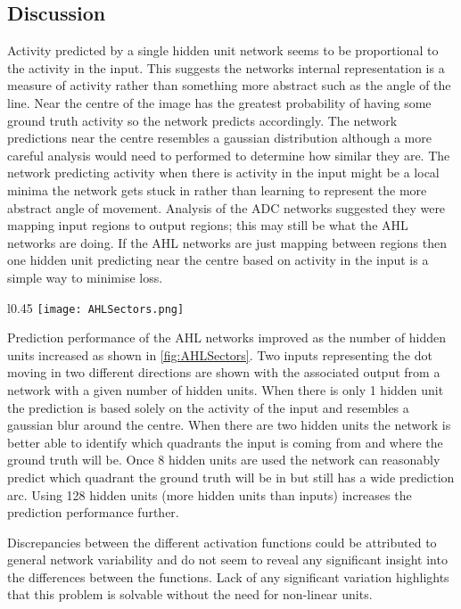 \subsection{Discussion}
Activity predicted by a single hidden unit network seems to be proportional to the activity in the input.
This suggests the networks internal representation is a measure of activity rather than something more abstract such as the angle of the line.
Near the centre of the image has the greatest probability of having some ground truth activity so the network predicts accordingly.
The network predictions near the centre resembles a gaussian distribution although a more careful analysis would need to performed to determine how similar they are. 
The network predicting activity when there is activity in the input might be a local minima the network gets stuck in rather than learning to represent the more abstract angle of movement. 
Analysis of the ADC networks suggested they were mapping input regions to output regions; this may still be what the AHL networks are doing. 
If the AHL networks are just mapping between regions then one hidden unit predicting near the centre based on activity in the input is a simple way to minimise loss. 

\begin{wrapfigure}[27]{l}{0.45\textwidth}
    \centering
    \texttt{[image: AHLSectors.png]}
    \caption{Two AHL inputs/prediction pairs for different numbers of hidden units.}
    \label{fig:AHLSectors}
\end{wrapfigure}

Prediction performance of the AHL networks improved as the number of hidden units increased as shown in \ref{fig:AHLSectors}.
Two inputs representing the dot moving in two different directions are shown with the associated output from a network with a given number of hidden units.  
When there is only 1 hidden unit the prediction is based solely on the activity of the input and resembles a gaussian blur around the centre.
When there are two hidden units the network is better able to identify which quadrants the input is coming from and where the ground truth will be.
Once 8 hidden units are used the network can reasonably predict which quadrant the ground truth will be in but still has a wide prediction arc.
Using 128 hidden units (more hidden units than inputs) increases the prediction performance further. 

Discrepancies between the different activation functions could be attributed to general network variability and do not seem to reveal any significant insight into the differences between the functions.
Lack of any significant variation highlights that this problem is solvable without the need for non-linear units. 

